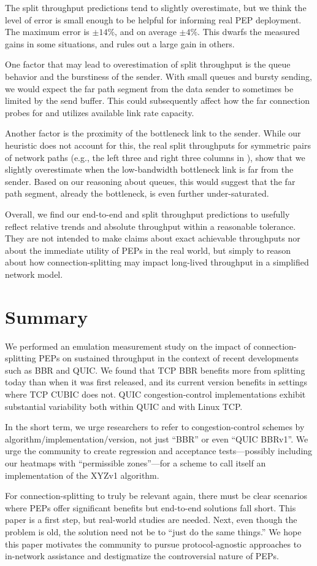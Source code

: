 The split throughput predictions tend to slightly overestimate, but we think
the level of error is small enough to be helpful for informing real PEP
deployment. The maximum error is $\pm14\%$, and on average $\pm4\%$. This
dwarfs the measured gains in some situations, and rules out a large gain in
others.

One factor that may lead to overestimation of split throughput is the queue
behavior and the burstiness of the sender. With small queues and bursty
sending, we would expect the far path segment from the data sender to sometimes
be limited by the send buffer. This could subsequently affect how the far
connection probes for and utilizes available link rate capacity.

Another factor is the proximity of the bottleneck link to the sender. While
our heuristic does not account for this, the real split throughputs for
symmetric pairs of network paths (e.g., the left three and right three columns
in ), show that we slightly overestimate
when the low-bandwidth bottleneck link is far from the sender.
Based on our reasoning about queues, this would suggest that the far path
segment, already the bottleneck, is even further under-saturated.

Overall, we find our end-to-end and split throughput predictions to usefully
reflect relative trends and absolute throughput within a
reasonable tolerance. They are not intended to make claims about exact achievable
throughputs nor about the immediate utility of PEPs in the real world,
but simply to reason about how connection-splitting may impact
long-lived throughput in a simplified network model.

\section{Summary}
\label{sec:splitting:summary}

We performed an emulation measurement study on the impact of
connection-splitting PEPs on sustained throughput in the context of recent
developments such as BBR and QUIC. We found that TCP BBR benefits more from
splitting today than when it was first released, and its current version
benefits in settings where TCP CUBIC does not. QUIC congestion-control
implementations exhibit substantial variability both within QUIC and with
Linux TCP.

In the short term, we urge researchers to refer to congestion-control schemes
by algorithm/implementation/version, not just ``BBR'' or even ``QUIC BBRv1''.
We urge the community to create regression and acceptance tests---possibly
including our heatmaps with ``permissible zones''---for a scheme to call
itself an implementation of the XYZv1 algorithm.

For connection-splitting to truly be relevant again, there must be clear
scenarios where PEPs offer significant benefits but end-to-end solutions fall
short. This paper is a first step, but real-world studies are needed. Next,
even though the problem is old, the solution need not be to ``just do the same
things.'' We hope this paper motivates the community to pursue
protocol-agnostic approaches to in-network assistance and destigmatize the
controversial nature of PEPs.

